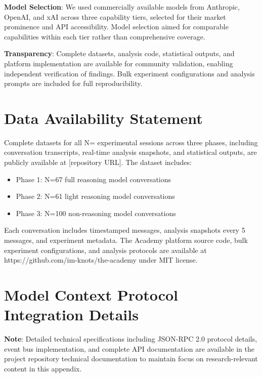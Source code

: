 \documentclass[11pt,letterpaper]{article}
\newcommand{\theacademy}{The Academy}
\newcommand{\exponedataTotalSessionsRaw}{67}
\newcommand{\exponedataTotalSessions}{N=\exponedataTotalSessionsRaw}
\newcommand{\exptwoTotalSessionsRaw}{61}
\newcommand{\exptwoTotalSessions}{N=\exptwoTotalSessionsRaw}
\newcommand{\expthreeTotalSessionsRaw}{100}
\newcommand{\expthreeTotalSessions}{N=\expthreeTotalSessionsRaw}
\newcommand{\totalAllPhasesRaw}{\fpeval{\exponedataTotalSessionsRaw + \exptwoTotalSessionsRaw + \expthreeTotalSessionsRaw}}
\newcommand{\totalAllPhases}{N=\totalAllPhasesRaw}
\begin{document}
\textbf{Model Selection}: We used commercially available models from Anthropic, OpenAI, and xAI across three capability tiers, selected for their market prominence and API accessibility. Model selection aimed for comparable capabilities within each tier rather than comprehensive coverage.

\textbf{Transparency}: Complete datasets, analysis code, statistical outputs, and platform implementation are available for community validation, enabling independent verification of findings. Bulk experiment configurations and analysis prompts are included for full reproducibility.

\section*{Data Availability Statement}

Complete datasets for all \totalAllPhases{} experimental sessions across three phases, including conversation transcripts, real-time analysis snapshots, and statistical outputs, are publicly available at [repository URL]. The dataset includes:

\begin{itemize}
    \item Phase 1: \exponedataTotalSessions{} full reasoning model conversations
    \item Phase 2: \exptwoTotalSessions{} light reasoning model conversations  
    \item Phase 3: \expthreeTotalSessions{} non-reasoning model conversations
\end{itemize}

Each conversation includes timestamped messages, analysis snapshots every 5 messages, and experiment metadata. \theacademy{} platform source code, bulk experiment configurations, and analysis protocols are available at https://github.com/im-knots/the-academy under MIT license.



\appendix

\section{Model Context Protocol Integration Details}
\label{app:mcp}

\textbf{Note}: Detailed technical specifications including JSON-RPC 2.0 protocol details, event bus implementation, and complete API documentation are available in the project repository technical documentation to maintain focus on research-relevant content in this appendix.
\end{document}
